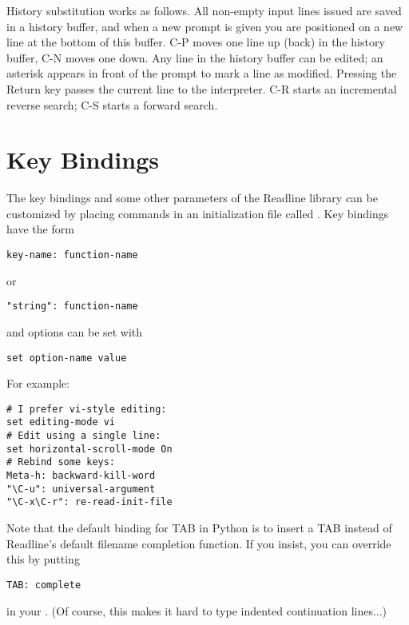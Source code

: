 \documentclass{manual}
\begin{document}
History substitution works as follows.  All non-empty input lines
issued are saved in a history buffer, and when a new prompt is given
you are positioned on a new line at the bottom of this buffer.  C-P
moves one line up (back) in the history buffer, C-N moves one down.
Any line in the history buffer can be edited; an asterisk appears in
front of the prompt to mark a line as modified.  Pressing the Return
key passes the current line to the interpreter.  C-R starts an
incremental reverse search; C-S starts a forward search.

\section{Key Bindings \label{keyBindings}}

The key bindings and some other parameters of the Readline library can
be customized by placing commands in an initialization file called
.  Key bindings have the form

\begin{verbatim}
key-name: function-name
\end{verbatim}

or

\begin{verbatim}
"string": function-name
\end{verbatim}

and options can be set with

\begin{verbatim}
set option-name value
\end{verbatim}

For example:

\begin{verbatim}
# I prefer vi-style editing:
set editing-mode vi
# Edit using a single line:
set horizontal-scroll-mode On
# Rebind some keys:
Meta-h: backward-kill-word
"\C-u": universal-argument
"\C-x\C-r": re-read-init-file
\end{verbatim}

Note that the default binding for TAB in Python is to insert a TAB
instead of Readline's default filename completion function.  If you
insist, you can override this by putting

\begin{verbatim}
TAB: complete
\end{verbatim}

in your .  (Of course, this makes it hard to type
indented continuation lines...)
\end{document}
